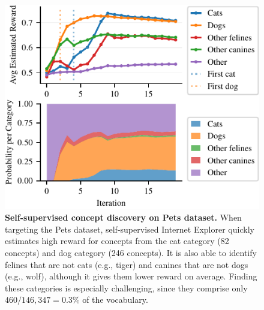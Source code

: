 \begin{figure}[t]
\centering
\includegraphics[width=0.8\linewidth]{figures/pets_ssl_reward_over_training2.pdf}
\caption{\textbf{Self-supervised concept discovery on Pets dataset.} When targeting the Pets dataset, self-supervised Internet Explorer quickly estimates high reward for concepts from the cat category (82 concepts) and dog category (246 concepts). It is also able to identify felines that are not cats (e.g., tiger) and canines that are not dogs (e.g., wolf), although it gives them lower reward on average. Finding these categories is especially challenging, since they comprise only $460/146{,}347 = 0.3\%$ of the vocabulary.}
\label{fig:reward_over_training}
\end{figure}


